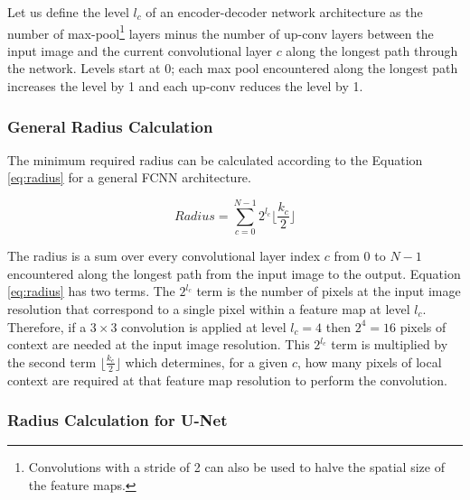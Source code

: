\documentclass[runningheads]{llncs}
\begin{document}
Let us define the level $l_{c}$ of an encoder-decoder network architecture as the number of max-pool\footnote{Convolutions with a stride of 2 can also be used to halve the spatial size of the feature maps.} layers minus the number of up-conv layers between the input image and the current convolutional layer $c$ along the longest path through the network. Levels start at 0; each max pool encountered along the longest path increases the level by 1 and each up-conv reduces the level by 1. 


\subsubsection{General Radius Calculation}
The minimum required radius can be calculated according to the Equation \ref{eq:radius} for a general FCNN architecture. 

\begin{equation}
Radius = \sum_{c=0}^{N-1} 2^{l_c} \lfloor \frac{k_c}{2} \rfloor
\label{eq:radius}
\end{equation}

The radius is a sum over every convolutional layer index $c$ from $0$ to $N-1$ encountered along the longest path from the input image to the output.
Equation \ref{eq:radius} has two terms. The $2^{l_c}$ term is the number of pixels at the input image resolution that correspond to a single pixel within a feature map at level $l_c$. Therefore, if a $3 \times 3$ convolution is applied at level $l_c=4$ then $2^4 = 16$ pixels of context are needed at the input image resolution. This $2^{l_c}$ term is multiplied by the second term $\lfloor \frac{k_c}{2} \rfloor$ which determines, for a given $c$, how many pixels of local context are required at that feature map resolution to perform the convolution.

\subsubsection{Radius Calculation for U-Net}


\end{document}

